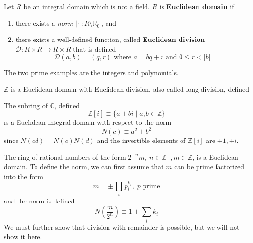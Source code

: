   \begin{definition}
    Let $R$ be an integral domain which is not a field. $R$ is \textbf{Euclidean domain} if 
    \begin{enumerate}
      \item there exists a \textit{norm} $|\cdot|: R \setminus \mathbb{R}_0^+$, and  
      \item there exists a well-defined function, called \textbf{Euclidean division} $\mathcal{D}: R \times R \rightarrow R \times R$ that is defined 
      \begin{equation}
        \mathcal{D}(a, b) = (q, r) \text{ where } a = bq + r \text{ and } 0 \leq r < |b|
      \end{equation}
    \end{enumerate}
  \end{definition}

  The two prime examples are the integers and polynomials. 

  \begin{example}[Integers]
    $\mathbb{Z}$ is a Euclidean domain with Euclidean division, also called long division, defined 

    \begin{center}
    \end{center}
  \end{example}

  \begin{example}
    The subring of $\mathbb{C}$, defined
    \begin{equation}
      \mathbb{Z}[i] \equiv \{ a + b i \mid a, b \in \mathbb{Z} \}
    \end{equation}
    is a Euclidean integral domain with respect to the norm 
    \begin{equation}
      N(c) \equiv a^2 + b^2
    \end{equation}
    since $N(c d) = N(c) N(d)$ and the invertible elements of $\mathbb{Z}[i]$ are $\pm 1, \pm i$. 
  \end{example}

  \begin{example}
    The ring of rational numbers of the form $2^{-n} m, \; n \in \mathbb{Z}_+, m \in \mathbb{Z}$, is a Euclidean domain. To define the norm, we can first assume that $m$ can be prime factorized into the form 
    \begin{equation}
      m = \pm \prod_{i} p_{i}^{k_i}, \; p \text{ prime}
    \end{equation}
    and the norm is defined 
    \begin{equation}
      N(\frac{m}{2^n}) \equiv 1 + \sum_i k_i
    \end{equation}
    We must further show that division with remainder is possible, but we will not show it here. 
  \end{example}

